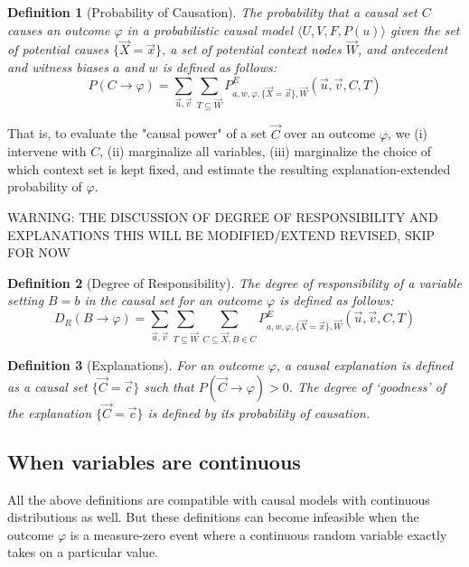\documentclass{article}
\newtheorem{definition}{Definition}
\begin{document}
\begin{definition}[Probability of Causation]
    The probability that a causal set \(C\) causes an outcome \(\varphi\) in a probabilistic causal model \(\langle U, V, F, P(u)\rangle\) given the set of potential causes \(\{\vec{X} = \vec{x}\}\), a set of potential context nodes \(\vec{W}\),  and antecedent and witness biases \(a\) and \(w\) is defined as follows:
    \[P(C \rightarrow \varphi) = \sum_{\vec{u}, \vec{v}} \sum_{T \subseteq \vec{W}}P^E_{a, w, \varphi, \{\vec{X} = \vec{x}\}, \vec{W}}(\vec{u}, \vec{v}, C, T) \]
\end{definition}


\noindent That is, to evaluate the "causal power" of a set $\vec{C}$  over an outcome $\varphi$, we (i) intervene with $C$, (ii) marginalize all variables, (iii) marginalize the choice of which context set is kept fixed, and estimate the resulting explanation-extended probability of $\varphi$.


WARNING: THE DISCUSSION OF DEGREE OF RESPONSIBILITY AND EXPLANATIONS THIS WILL BE MODIFIED/EXTEND REVISED, SKIP FOR NOW

\begin{definition}[Degree of Responsibility] The degree of responsibility of a variable setting \(B=b\) in the causal set %
for an outcome \(\varphi\) is defined as follows:
\[D_R(B \rightarrow \varphi) = \sum_{\vec{u}, \vec{v}} \sum_{T \subseteq \vec{W}} \sum_{C \subseteq \vec{X}, B \in C}P^E_{a, w, \varphi, \{\vec{X} = \vec{x}\}, \vec{W}}(\vec{u}, \vec{v}, C, T)\]
\end{definition}

\begin{definition}[Explanations]
    For an outcome \(\varphi\), a causal explanation is defined as a causal set \(\{\vec{C} = \vec{c}\}\) such that \(P(\vec{C} \rightarrow \varphi) > 0\). The degree of `goodness' of the explanation \(\{\vec{C} = \vec{c}\}\) is defined by its probability of causation.
\end{definition}

\subsection{When variables are continuous}

All the above definitions are compatible with causal models with continuous distributions as well. But these definitions can become infeasible when the outcome \(\varphi\) is a measure-zero event where a continuous random variable exactly takes on a particular value.
\end{document}
